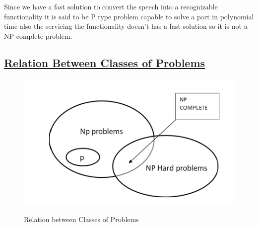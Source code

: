 \hspace{1em}Since we have a fast solution to convert the speech into a recognizable functionality it is said to be P type problem capable to solve a part in polynomial time also the servicing the functionality doesn't has a fast solution so it  is not a NP complete problem.
\subsection*{\underline{Relation Between Classes of Problems}}
 \begin{figure}[H]
    \centering
  \includegraphics[scale=0.9]{np.png}\\
  \caption{Relation between Classes of Problems}
  
\end{figure}
